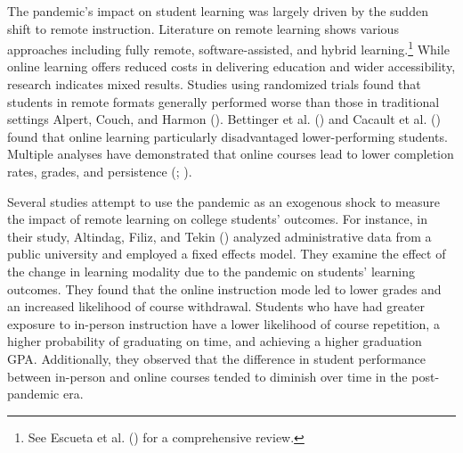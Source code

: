 \documentclass[
  12pt,
  letterpaper,
  DIV=11,
  numbers=noendperiod]{scrartcl}
\begin{document}
The pandemic's impact on student learning was largely driven by the
sudden shift to remote instruction. Literature on remote learning shows
various approaches including fully remote, software-assisted, and hybrid
learning.\footnote{See Escueta et al.
  () for a comprehensive
  review.} While online learning offers reduced costs in delivering
education and wider accessibility, research indicates mixed results.
Studies using randomized trials found that students in remote formats
generally performed worse than those in traditional settings Alpert,
Couch, and Harmon ().
Bettinger et al. () and
Cacault et al. () found that
online learning particularly disadvantaged lower-performing students.
Multiple analyses have demonstrated that online courses lead to lower
completion rates, grades, and persistence
(;
).

Several studies attempt to use the pandemic as an exogenous shock to
measure the impact of remote learning on college students' outcomes. For
instance, in their study, Altindag, Filiz, and Tekin
() analyzed administrative data
from a public university and employed a fixed effects model. They
examine the effect of the change in learning modality due to the
pandemic on students' learning outcomes. They found that the online
instruction mode led to lower grades and an increased likelihood of
course withdrawal. Students who have had greater exposure to in-person
instruction have a lower likelihood of course repetition, a higher
probability of graduating on time, and achieving a higher graduation
GPA. Additionally, they observed that the difference in student
performance between in-person and online courses tended to diminish over
time in the post-pandemic era.
\end{document}
